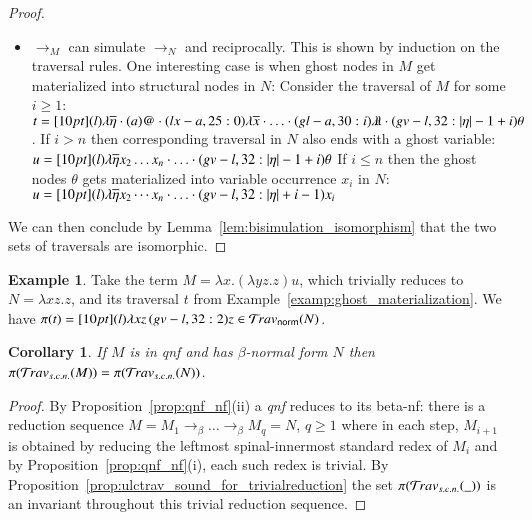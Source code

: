 \documentclass{elsarticle}
\def\endproofatend{\end{proof}}
\theoremstyle{plain}
\newtheorem{corollary}[theorem]{Corollary}
\theoremstyle{definition}
\newtheorem{example}{Example}[section]
\newcommand{\ghostlmd}{{\lambda\!\!\lambda}}
\newcommand{\ghostvar}{\theta}
\newcommand{\normalizing}{{\sf norm}}
\newcommand{\travsetnorm}{\travset_\normalizing} %
\newcommand{\travsetscn}{\travset_{s.c.n.}} %
\def\coresymbol{\pi} %
\newcommand{\core}[1]{\coresymbol(#1)} %
\begin{document}
\begin{proof}
\begin{itemize}
    \item $\rightarrow_M$ can simulate $\rightarrow_N$ and reciprocally. This is shown by induction on the traversal rules. One interesting case is when ghost nodes in $M$ get materialized into structural nodes in $N$:
    Consider the traversal of $M$ for some $i\geq1$:
    $t = \Pstr[10pt]{
        (l){\lambda\overline\eta} \cdot (a)@ \cdot (lx-a,25:0){\lambda\overline{x}} \cdot \ldots \cdot (gl-a,30:i)\ghostlmd \cdot (gv-l,32:{|\eta|-1+i})\ghostvar }
    $.
    If $i>n$ then corresponding traversal in $N$
    also ends with a ghost variable:
    $u = \Pstr[10pt]{
        (l){\lambda\overline\eta x_2 \ldots x_n} \cdot \ldots \cdot  (gv-l,32:{|\eta|-1+i})\ghostvar }
    $
    If $i\leq n$ then the ghost nodes $\ghostvar$ gets materialized into variable occurrence $x_i$ in $N$:
    $u = \Pstr[10pt]{
        (l){\lambda\overline\eta x_2\cdots x_n} \cdot \ldots \cdot  (gv-l,32:{|\eta|+i-1}){x_i} }
    $
    \end{itemize}
    We can then conclude by Lemma~\ref{lem:bisimulation_isomorphism} that the two sets of traversals are isomorphic.
\end{proof}

\begin{example}
    Take the term $M = \lambda x. (\lambda y z.z) u$, which trivially reduces to $N = \lambda x z . z$, and its traversal $t$ from Example~\ref{examp:ghost_materialization}.
    We have $\coresymbol(t) = \Pstr[10pt]{ (l){\lambda x z} \, (gv-l,32:2){z} } \in \travsetnorm(N)$.
\end{example}


\begin{corollary}
\label{cor:qnf_and_nf_traveset_invariant}
If $M$ is in \emph{qnf} and has $\beta$-normal form $N$ then $\coresymbol(\travsetscn(M)) = \coresymbol(\travsetscn(N))$.
\end{corollary}
\begin{proof}
By Proposition~\ref{prop:qnf_nf}(ii) a \emph{qnf} reduces to its beta-nf: there is a reduction sequence $M = M_1 \rightarrow_\beta \ldots \rightarrow_\beta M_q= N$, $q\geq1$  where in each step, $M_{i+1}$ is obtained by reducing the leftmost spinal-innermost standard redex of $M_i$
and by Proposition~\ref{prop:qnf_nf}(i), each such redex is trivial. By Proposition~\ref{prop:ulctrav_sound_for_trivialreduction}
the set $\core{\travsetscn(\_)}$ is an invariant throughout this trivial reduction sequence.
\end{proof}
\end{document}
